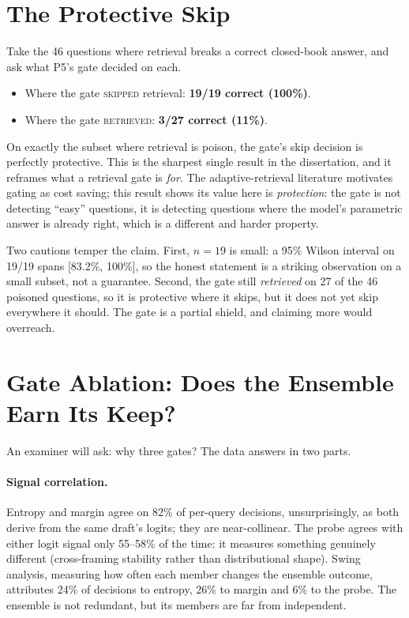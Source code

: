 \section{The Protective Skip}
\label{sec:eval-protective}

Take the 46 questions where retrieval breaks a correct closed-book answer,
and ask what P5's gate decided on each.

\begin{itemize}
  \item Where the gate \textsc{skipped} retrieval: \textbf{19/19 correct
    (100\%)}.
  \item Where the gate \textsc{retrieved}: \textbf{3/27 correct (11\%)}.
\end{itemize}

On exactly the subset where retrieval is poison, the gate's skip decision is
perfectly protective. This is the sharpest single result in the
dissertation, and it reframes what a retrieval gate is \emph{for}. The
adaptive-retrieval literature motivates gating as cost saving; this result
shows its value here is \emph{protection}: the gate is not detecting
``easy'' questions, it is detecting questions where the model's parametric
answer is already right, which is a different and harder property.

Two cautions temper the claim. First, $n=19$ is small: a 95\% Wilson
interval on 19/19 spans [83.2\%, 100\%], so the honest statement is a
striking observation on a small subset, not a guarantee.
Second, the gate still \emph{retrieved} on 27 of the 46 poisoned questions,
so it is protective where it skips, but it does not yet skip everywhere it
should. The gate is a partial shield, and claiming more would overreach.

\section{Gate Ablation: Does the Ensemble Earn Its Keep?}
\label{sec:eval-ablation}

An examiner will ask: why three gates? The data answers in two parts.

\paragraph{Signal correlation.} Entropy and margin agree on 82\% of per-query
decisions, unsurprisingly, as both derive from the same draft's logits; they
are near-collinear. The probe agrees with either logit signal only
55--58\% of the time: it measures something genuinely different
(cross-framing stability rather than distributional shape). Swing analysis,
measuring how often each member changes the ensemble outcome, attributes
24\% of decisions to entropy, 26\% to margin and 6\% to the probe. The ensemble is
not redundant, but its members are far from independent.

